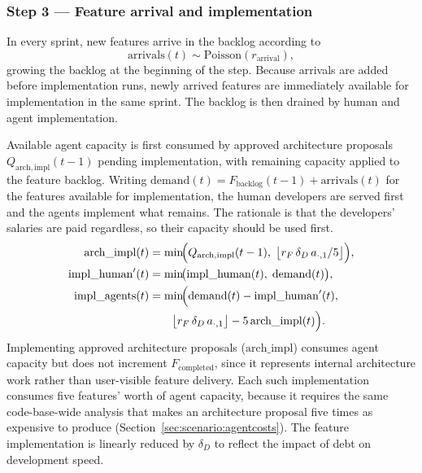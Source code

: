 \documentclass[smallextended]{svjour3}       %
\begin{document}
\subsubsection*{Step 3 --- Feature arrival and implementation}
In every sprint, new features arrive in the backlog according to
\begin{equation}
  \mathrm{arrivals}(t) \sim \mathrm{Poisson}(r_\mathrm{arrival}),
  \label{eq:arrivals}
\end{equation}
growing the backlog at the beginning of the step. Because arrivals are added before implementation runs, newly arrived features are immediately available for implementation in the same sprint. The backlog is then drained by human and agent implementation.

Available agent capacity is first consumed by approved architecture proposals
$Q_\mathrm{arch,impl}(t-1)$ pending implementation, with remaining capacity applied
to the feature backlog. Writing
$\mathrm{demand}(t) = F_\mathrm{backlog}(t-1) + \mathrm{arrivals}(t)$ for the features
available for implementation, the human developers are served first and the agents
implement what remains. The rationale is that the developers' salaries are paid regardless, so their capacity should be used first.
\begin{align}
  \mathrm{arch\_impl}(t) &= \min\!\Bigl(Q_\mathrm{arch,impl}(t-1),\;
    \bigl\lfloor r_F\,\delta_D\,a_{\cdot,1}/5\bigr\rfloor\Bigr),
  \label{eq:arch_impl} \\
  \mathrm{impl\_human}'(t) &= \min\!\bigl(\mathrm{impl\_human}(t),\;\mathrm{demand}(t)\bigr),
  \label{eq:impl_human_capped} \\
  \mathrm{impl\_agents}(t) &= \min\!\Bigl(\mathrm{demand}(t) - \mathrm{impl\_human}'(t),\;
    \nonumber \\
  &\qquad\bigl\lfloor r_F\,\delta_D\,a_{\cdot,1}\bigr\rfloor - 5\,\mathrm{arch\_impl}(t)\Bigr).
  \label{eq:impl_agents}
\end{align}
Implementing approved architecture proposals ($\mathrm{arch\_impl}$) consumes agent
capacity but does not increment $F_\mathrm{completed}$, since it represents internal
architecture work rather than user-visible feature delivery. Each such implementation
consumes five features' worth of agent capacity, because it requires the same
code-base-wide analysis that makes an architecture proposal five times as expensive to
produce (Section~\ref{sec:scenario:agentcosts}). The feature implementation is linearly reduced by $\delta_D$ to reflect the impact of debt on development speed.
\end{document}
